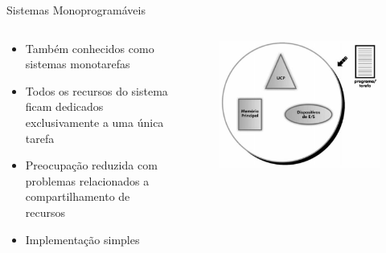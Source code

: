 \documentclass[aspectratio=169,
				xcolor=table]{beamer}
\begin{document}
	\begin{frame}{Sistemas Monoprogramáveis}
		\begin{columns}
			\begin{column}{0.5\textwidth}			
				\begin{itemize}
					\item Também conhecidos como sistemas monotarefas
					\vspace{1em}
					\item Todos os recursos do sistema ficam dedicados exclusivamente a uma única tarefa
					\vspace{1em}
					\item Preocupação reduzida com problemas relacionados a compartilhamento de recursos
					\vspace{1em}
					\item Implementação simples
				\end{itemize}
			\end{column}
			\begin{column}{0.5\textwidth}
			\begin{figure}[hbtp]
				\centering
				\includegraphics[width=.85\textwidth, keepaspectratio]{../figs/cap01/monotarefa.png}
			\end{figure}
			\end{column}
		\end{columns}
	\end{frame}
	
\end{document}
